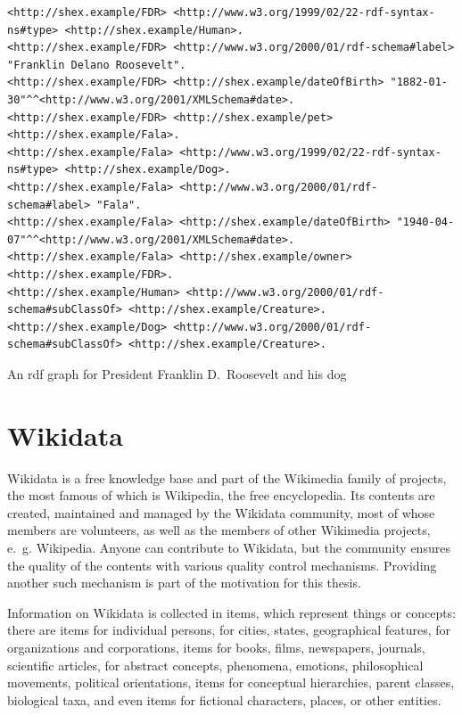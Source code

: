 \begin{sidewayslstfloat}
\begin{lstlisting}
<http://shex.example/FDR> <http://www.w3.org/1999/02/22-rdf-syntax-ns#type> <http://shex.example/Human>.
<http://shex.example/FDR> <http://www.w3.org/2000/01/rdf-schema#label> "Franklin Delano Roosevelt".
<http://shex.example/FDR> <http://shex.example/dateOfBirth> "1882-01-30"^^<http://www.w3.org/2001/XMLSchema#date>.
<http://shex.example/FDR> <http://shex.example/pet> <http://shex.example/Fala>.
<http://shex.example/Fala> <http://www.w3.org/1999/02/22-rdf-syntax-ns#type> <http://shex.example/Dog>.
<http://shex.example/Fala> <http://www.w3.org/2000/01/rdf-schema#label> "Fala".
<http://shex.example/Fala> <http://shex.example/dateOfBirth> "1940-04-07"^^<http://www.w3.org/2001/XMLSchema#date>.
<http://shex.example/Fala> <http://shex.example/owner> <http://shex.example/FDR>.
<http://shex.example/Human> <http://www.w3.org/2000/01/rdf-schema#subClassOf> <http://shex.example/Creature>.
<http://shex.example/Dog> <http://www.w3.org/2000/01/rdf-schema#subClassOf> <http://shex.example/Creature>.
\end{lstlisting}
\caption{An \gls{rdf} graph for President Franklin D.~Roosevelt and his dog}
\label{lst:rdf-example}
\end{sidewayslstfloat}

\section{Wikidata}
\label{sec:Background:Wikidata}

\Gls{Wikidata} \cite{Vrandecic:2014:WFC:2661061.2629489}
is a free knowledge base
and part of the \gls{Wikimedia} family of projects,
the most famous of which is \gls{Wikipedia}, the free encyclopedia.
Its contents are created, maintained and managed by the \gls{Wikidata} community,
most of whose members are volunteers,
as well as the members of other \gls{Wikimedia} projects, e.~g. \gls{Wikipedia}.
Anyone can contribute to \gls{Wikidata},
but the community ensures the quality of the contents with various quality control mechanisms.
Providing another such mechanism is part of the motivation for this thesis.

Information on \gls{Wikidata} is collected in \glspl{item},
which represent things or concepts:
there are \glspl{item} for individual persons,
for cities, states, geographical features,
for organizations and corporations,
\glspl{item} for books, films, newspapers, journals, scientific articles,
for abstract concepts, phenomena, emotions, philosophical movements, political orientations,
\glspl{item} for conceptual hierarchies, parent classes, biological taxa,
and even \glspl{item} for fictional characters, places, or other entities.

